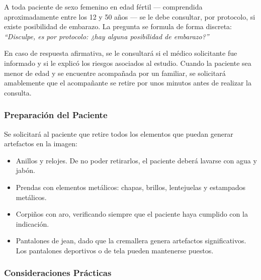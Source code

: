 	A toda paciente de sexo femenino en edad fértil --- comprendida
	aproximadamente entre los 12 y 50 años --- se le debe consultar, por
	protocolo, si existe posibilidad de embarazo. La pregunta se formula de
	forma discreta: \textit{``Disculpe, es por protocolo: ¿hay alguna
		posibilidad de embarazo?''}
	
	En caso de respuesta afirmativa, se le consultará si el médico solicitante
	fue informado y si le explicó los riesgos asociados al estudio. Cuando la
	paciente sea menor de edad y se encuentre acompañada por un familiar, se
	solicitará amablemente que el acompañante se retire por unos minutos antes
	de realizar la consulta.
	
	\subsubsection*{Preparación del Paciente}
	
	Se solicitará al paciente que retire todos los elementos que puedan generar
	artefactos en la imagen:
	
	\begin{itemize}
		\item Anillos y relojes. De no poder retirarlos, el paciente deberá
		lavarse con agua y jabón.
		\item Prendas con elementos metálicos: chapas, brillos, lentejuelas y
		estampados metálicos.
		\item Corpiños con aro, verificando siempre que el paciente haya
		cumplido con la indicación.
		\item Pantalones de jean, dado que la cremallera genera artefactos
		significativos. Los pantalones deportivos o de tela pueden mantenerse
		puestos.
	\end{itemize}
	
	\subsubsection*{Consideraciones Prácticas}
	
